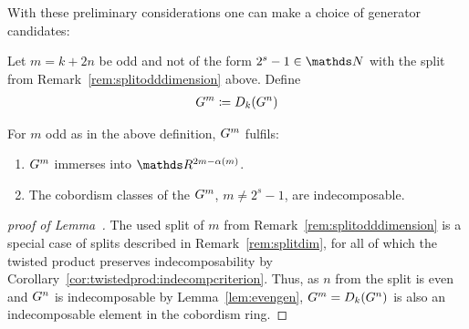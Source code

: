 With these preliminary considerations one can make a choice of
generator candidates:
\begin{Def}
  Let $m=k+2n$ be odd and not of the form $2^s-1\in\Nat$ with the
  split from Remark~\ref{rem:splitodddimension} above. Define
  \begin{gather*}
    G^{m} \coloneqq D_{k}({G^{n}})
  \end{gather*}
\end{Def}
\begin{Lem}\label{lem:oddgen}
  For $m$ odd as in the above definition, $G^{m}$ fulfils:
  \begin{enumerate}
  \item\label{item:brownimmersionproperty}
    $G^{m}$ immerses into $\R^{2m-\alpha(m)}$.
  \item\label{item:indecomposabilityproperty}
    The cobordism classes of the $G^{m}$, $m\neq 2^s-1$, are
    indecomposable.
  \end{enumerate}
\end{Lem}
\begin{proof}[proof of
  Lemma~]
  The used split of $m$ from Remark~\ref{rem:splitodddimension} is a
  special case of splits described in Remark~\ref{rem:splitdim}, for
  all of which the twisted product preserves indecomposability by
  Corollary~\ref{cor:twistedprod:indecompcriterion}.
  Thus, as $n$ from the split is even and $G^{n}$ is indecomposable by
  Lemma~\ref{lem:evengen}, $G^{m}=D_{k}({G^{n}})$ is also an
  indecomposable element in the cobordism ring.
\end{proof}
